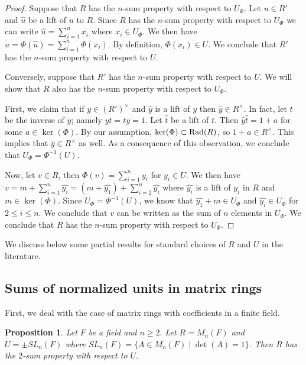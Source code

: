 \documentclass[11pt, a4paper]{amsart}
\newtheorem{prop}[thm]{Proposition}
\theoremstyle{definition}
\numberwithin{equation}{section}
\newcommand{\Rad}{{\rm Rad}}
\begin{document}
\begin{proof}
    Suppose that $R$ has the $n$-sum property with respect to $U_{\Phi}.$ Let $u \in R'$ and $\widehat{u}$ be a lift of $u$ to $R.$ Since $R$ has the $n$-sum property with respect to $U_{\Phi}$ we can write $\widehat{u} = \sum_{i=1}^n x_i$ where $x_i  \in U_{\Phi}.$ We then have $u = \Phi(\widehat{u})= \sum_{i=1}^n \Phi(x_i).$ 
    By definition, $\Phi(x_i) \in U.$ We conclude that $R'$ has the $n$-sum property with respect to $U.$


    Conversely, suppose that $R'$ has the $n$-sum property with respect to $U.$ We will show that $R$ also has the $n$-sum property with respect to $U_{\Phi}$. 
    
    
    First, we claim that if $y \in (R')^{\times}$ and $\widehat{y}$ is a lift of $y$ then $\widehat{y} \in R^{\times}.$ In fact, let $t$ be the inverse of $y$; namely $yt=ty=1.$ Let $\widehat{t}$ be a lift of $t.$ Then $\widehat{y} \widehat{t}=1+a$ for some $a \in \ker(\Phi).$ By our assumption, $\ker(\Phi) \subset \Rad(R)$, so $1+a \in R^{\times}.$ This implies that $\widehat{y} \in R^{\times}$ as well. As a consequence of this observation, we conclude that $U_{\Phi}= \Phi^{-1}(U).$
    
    
    Now, let $v \in R$, then $\Phi(v)=\sum_{i=1}^n y_i$ for $y_i \in U.$ We then have $v =m + \sum_{i=1}^n \widehat{y_i} = (m+\widehat{y_1}) + \sum_{i=2}^n \widehat{y_i} $ where $\widehat{y_i}$ is a lift of $y_i$ in $R$ and $m \in \ker(\Phi)$. Since $U_{\Phi}=\Phi^{-1}(U)$, we know that $\widehat{y_1}+m  \in U_{\Phi} $ and $\widehat{y_i} \in U_{\Phi}$ for $2 \leq i \leq n.$  We conclude that $v$ can be written as the sum of $n$ elements in $U_{\Phi}$. We conclude that $R$ has the $n$-sum property with respect to $U_{\Phi}.$
\end{proof}
We discuss below some partial results for standard choices of $R$ and $U$ in the literature. 

\subsection{Sums of normalized units in matrix rings}
First, we deal with the case of matrix rings with coefficients in a finite field. 

\begin{prop}
Let $F$ be a field and $n \geq 2.$ Let $R=M_n(F)$ and $U= \pm SL_n(F)$ where $SL_n(F)=\{A \in M_n(F) \mid \det(A)=1\}.$ Then $R$ has the $2$-sum property with respect to $U.$
\end{prop}
\end{document}
